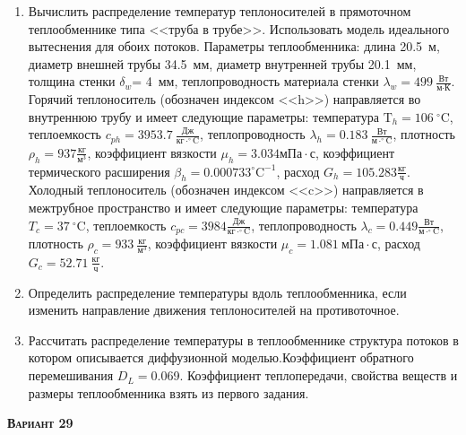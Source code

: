 \begin{enumerate} 
\item Вычислить распределение температур теплоносителей в прямоточном теплообменнике типа <<труба в трубе>>. Использовать модель идеального вытеснения для обоих потоков. Параметры теплообменника: длина  20.5~м, диаметр внешней трубы 34.5~мм,  диаметр внутренней трубы 20.1~мм, толщина стенки $\delta_{w}$=     4~мм,  теплопроводность материала стенки $\lambda_{w}=  499~\frac{\text{Вт}}{\text{м} \cdot \text{К}}$.  Горячий теплоноситель (обозначен индексом <<h>>) направляется во внутреннюю трубу и	 имеет следующие параметры: температура $\text{T}_{h}= 106~^\circ\mathrm{C}$, теплоемкость	  $c_{p{h}}= 3953.7~\frac{\text{Дж}}{\text{кг} \cdot ^\circ\mathrm{C}}$, теплопроводность 		$\lambda_{h}= 0.183~\frac{\text{Вт}}{\text{м} \cdot ^\circ\mathrm{C}}$, плотность 		$\rho_{h}=  937 \frac{\text{кг}}{\text{м}^3}$, коэффициент вязкости $\mu_{h}=3.034 \text{мПа} 		\cdot \text{с} $, коэффициент термического расширения $\beta_{h}=0.000733 ^\circ\mathrm{C}^{-1}$,		 расход $G_{h}= 105.283 \frac{\text{кг}}{\text{ч}}$. Холодный теплоноситель (обозначен индексом <<c>>) 		 направляется в межтрубное пространство и имеет следующие параметры: температура $T_{c}=   37		 ~^\circ\mathrm{C}$, теплоемкость $c_{p{c}}= 3984 \frac{\text{Дж}}{\text{кг} \cdot ^\circ\mathrm{C}}$,			 теплопроводность $\lambda_{c}=0.449 \frac{\text{Вт}}{\text{м} \cdot ^\circ\mathrm{C}}$, плотность 			 $\rho_{c}=   933~\frac{\text{кг}}{\text{м}^3}$, коэффициент вязкости $\mu_{c}=1.081~\text{мПа} \cdot \text{с} $, 			 расход $G_{c}=52.71~\frac{\text{кг}}{\text{ч}}$. 

\item Определить распределение температуры вдоль теплообменника, если 	изменить направление движения теплоносителей на противоточное.

\item Рассчитать распределение температуры в теплообменнике структура потоков в котором описывается диффузионной моделью.Коэффициент обратного перемешивания $D_L = $0.069. Коэффициент теплопередачи, свойства веществ и размеры теплообменника взять из первого задания. 

\end{enumerate}

\textsc{\textbf{Вариант 29}}


